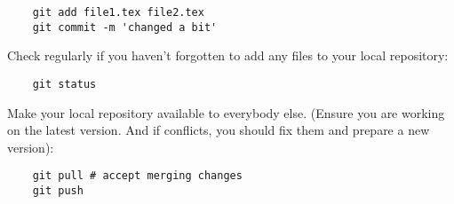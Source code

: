 \begin{verbatim}
    git add file1.tex file2.tex
    git commit -m 'changed a bit'
\end{verbatim}

Check regularly if you haven't forgotten to add any files to your local repository:
\begin{verbatim}
    git status
\end{verbatim}

Make your local repository available to everybody else. (Ensure you are working on the latest version. And if conflicts, you should fix them and prepare a new version):
\begin{verbatim}
    git pull # accept merging changes
    git push
\end{verbatim}

